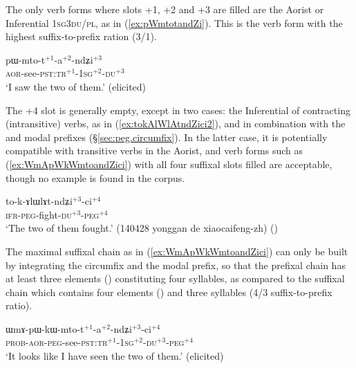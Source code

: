 The only verb forms where slots +1, +2 and +3 are filled are the Aorist or Inferential \textsc{1sg}\fl{}3\textsc{du/pl}, as in (\ref{ex:pWmtotandZi}). This is the verb form with the highest suffix-to-prefix ration (3/1).

\begin{exe}
\ex \label{ex:pWmtotandZi}
\gll pɯ-mto-t$^{+1}$-a$^{+2}$-ndʑi$^{+3}$\\
\textsc{aor}-see-\textsc{pst}:\textsc{tr}$^{+1}$-\textsc{1sg}$^{+2}$-\textsc{du}$^{+3}$ \\
\glt `I saw the two of them.' (elicited)
\end{exe}
 
The +4 slot is generally empty, except in two cases: the Inferential of contracting (intransitive) verbs, as in (\ref{ex:tokAlWlAtndZici2}), and  in combination with the  and  modal prefixes (§\ref{sec:peg.circumfix}). In the latter case, it is potentially compatible with transitive verbs in the Aorist, and verb forms such as (\ref{ex:WmApWkWmtoandZici}) with all four suffixal slots filled are acceptable, though no example is found in the corpus.

\begin{exe}
\ex \label{ex:tokAlWlAtndZici2}
\gll to-k-ɤlɯlɤt-ndʑi$^{+3}$-ci$^{+4}$ \\
\textsc{ifr}-\textsc{peg}-fight-\textsc{du}$^{+3}$-\textsc{peg}$^{+4}$ \\
\glt `The two of them fought.' (140428 yonggan de xiaocaifeng-zh) 	()
\end{exe}
 
The maximal suffixal chain as in (\ref{ex:WmApWkWmtoandZici}) can only be built by integrating the circumfix   and the modal  prefix, so that the prefixal chain has at least three elements () constituting four syllables, as compared to the suffixal chain which contains  four elements () and three syllables (4/3 suffix-to-prefix ratio).
 
\begin{exe}
\ex \label{ex:WmApWkWmtoandZici}
\gll  ɯmɤ-pɯ-kɯ-mto-t$^{+1}$-a$^{+2}$-ndʑi$^{+3}$-ci$^{+4}$ \\
 \textsc{prob}-\textsc{aor}-\textsc{peg}-see-\textsc{pst}:\textsc{tr}$^{+1}$-\textsc{1sg}$^{+2}$-\textsc{du}$^{+3}$-\textsc{peg}$^{+4}$ \\
 \glt `It looks like I have seen the two of them.' (elicited)
\end{exe} 
 
